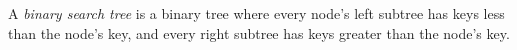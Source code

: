 \documentclass[12pt]{article}
\begin{document}
A \emph{binary search tree} is  a binary tree where every node's left subtree has keys less 
than the node's key, and every right subtree has keys greater than the node's key.
\end{document}
